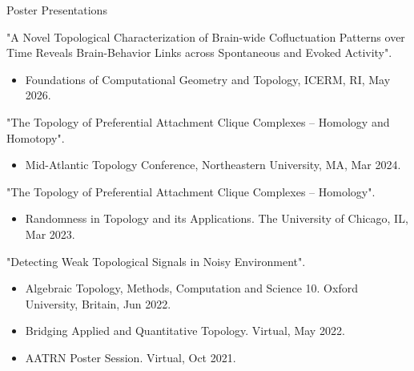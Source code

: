 \documentclass{resume} %
\begin{document}
\begin{rSection}{Poster Presentations}

"A Novel Topological Characterization of Brain-wide Cofluctuation Patterns over Time Reveals Brain-Behavior Links across Spontaneous and Evoked Activity".
\begin{itemize}[noitemsep]
    \item Foundations of Computational Geometry and Topology, ICERM, RI, May 2026.
\end{itemize}

"The Topology of Preferential Attachment Clique Complexes -- Homology and Homotopy".
\begin{itemize}[noitemsep]
    \item Mid-Atlantic Topology Conference, Northeastern University, MA, Mar 2024.
\end{itemize}
"The Topology of Preferential Attachment Clique Complexes -- Homology".
\begin{itemize}[noitemsep]
    \item Randomness in Topology and its Applications. The University of Chicago, IL, Mar 2023.
\end{itemize}
"Detecting Weak Topological Signals in Noisy Environment".
\begin{itemize}[noitemsep]
    \item Algebraic Topology, Methods, Computation and Science 10. Oxford University, Britain, Jun 2022.
    \item Bridging Applied and Quantitative Topology. Virtual, May 2022.
    \item AATRN Poster Session. Virtual, Oct 2021.
\end{itemize}
\end{rSection}
\end{document}
